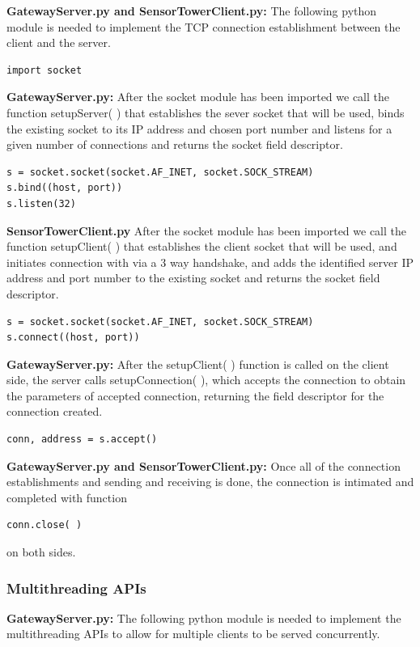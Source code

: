 \documentclass[paper=a4, fontsize=12pt]{scrartcl}
\numberwithin{equation}{section}		%
\numberwithin{figure}{section}			%
\numberwithin{table}{section}				%
\begin{document}
\textbf{GatewayServer.py and SensorTowerClient.py:}
The following python module is needed to implement the TCP connection establishment between the client and the server.
\begin{verbatim}
import socket
\end{verbatim}
\textbf{GatewayServer.py:}
After the socket module has been imported we call the function setupServer( ) that establishes the sever socket that will be used, binds the existing socket to its IP address and chosen port number and listens for a given number of connections and returns the socket field descriptor.

\begin{verbatim}
s = socket.socket(socket.AF_INET, socket.SOCK_STREAM)
s.bind((host, port))
s.listen(32)
\end{verbatim}
\textbf{SensorTowerClient.py} 
After the socket module has been imported we call the function setupClient( ) that establishes the client socket that will be used, and initiates connection with via a 3 way handshake, and adds the identified server IP address and port number to the existing socket and returns the socket field descriptor.

\begin{verbatim}
s = socket.socket(socket.AF_INET, socket.SOCK_STREAM)
s.connect((host, port))
\end{verbatim}
\textbf{GatewayServer.py:}
After the setupClient( ) function is called on the client side, the server calls setupConnection( ), which accepts the connection to obtain the parameters of accepted connection, returning the field descriptor for the connection created.
\begin{verbatim}
conn, address = s.accept() 
\end{verbatim}
\textbf{GatewayServer.py and SensorTowerClient.py:}
Once all of the connection establishments and sending and receiving is done, the connection is intimated and completed with function
\begin{verbatim}
conn.close( ) 
\end{verbatim}
on both sides.

\subsubsection{Multithreading APIs}

\textbf{GatewayServer.py:}
The following python module is needed to implement the multithreading APIs to allow for multiple clients to be served concurrently.
\end{document}
